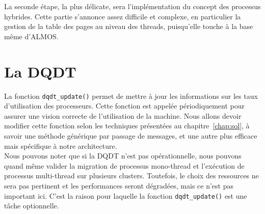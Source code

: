     La seconde étape, la plus délicate, sera l'implémentation du concept des
    processus hybrides. Cette partie s'annonce assez difficile et complexe, en
    particulier la gestion de la table des pages au niveau des threads,
    puisqu'elle touche à la base même d'ALMOS.


  \section{La DQDT}  

    La fonction \texttt{dqdt\_update()} permet de mettre à jour les informations
    sur les taux d'utilisation des processeurs. Cette fonction est appelée
    périodiquement pour assurer une vision correcte de l'utilisation de la
    machine. Nous allons devoir modifier cette fonction selon les techniques
    présentées au chapitre~\ref{chap:sol}, à savoir une méthode générique par
    passage de messages, et une autre plus efficace mais spécifique à notre
    architecture.\\

    Nous pouvons noter que si la DQDT n'est pas opérationnelle, nous pouvons
    quand même valider la migration de processus mono-thread et l'exécution de
    processus multi-thread sur plusieurs clusters. Toutefois, le choix des
    ressources ne sera pas pertinent et les performances seront dégradées, mais
    ce n'est pas important ici. C'est la raison pour laquelle la fonction
    \texttt{dqdt\_update()} est une tâche optionnelle.
